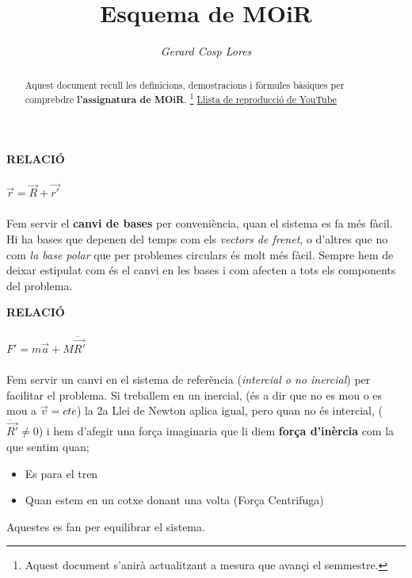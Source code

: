 \documentclass[11pt]{article}
\title{\textbf{Esquema de MOiR}}
\author{\textit{Gerard Cosp Lores}}
\date{}
\begin{document}
\maketitle

\maketitle

\begin{abstract}
Aquest document recull les definicions, demostracions i fòrmules bàsiques per comprebdre \textbf{l'assignatura de MOiR}. \footnote{Aquest document s'anirà actualitzant a mesura que avançi el semmestre.}  \href{https://www.youtube.com/playlist?list=PLHUo38kJ-fy_nZMtgL7zuIbyaXeBjjC-e}{Llista de reproducció de YouTube}
\end{abstract}

\begin{tcolorbox}[
  title= Canvis de Base,
  colback=RoyalBlue!5!white,
  colframe=RoyalBlue!70!black,
  coltitle=white,
  colbacktitle=RoyalBlue!70!black,
  fonttitle=\bfseries,
  arc=6pt,
  boxrule=0.8pt
]

\textbf{RELACIÓ}\\
\\
$\vec{r} = \vec{R} + \vec{r'}$\\
\\
Fem servir el \textbf{canvi de bases} per conveniència, quan el sistema es fa més fàcil. Hi ha bases que depenen del temps com els \textit{vectors de frenet}, o d'altres que no com \textit{la base polar} que per problemes circulars és molt més fàcil. Sempre hem de deixar estipulat com és el canvi en les bases i com afecten a tots els components del problema.
\end{tcolorbox}

\begin{tcolorbox}[
  title=Sistemes de Referència,
  colback=SlateGray!5!white,
  colframe=SlateGray!70!black,
  coltitle=white,
  colbacktitle=SlateGray!70!black,
  fonttitle=\bfseries,
  arc=6pt,
  boxrule=0.8pt
]

\textbf{RELACIÓ}\\
\\
$F' = m\vec{a} + M\ddot{\vec{R'}}$\\
\\
Fem servir un canvi en el sistema de referència (\textit{intercial o no inercial}) per facilitar el problema. Si treballem en un inercial, (és a dir que no es mou o es mou a $\vec{v} = cte$) la 2a Llei de Newton aplica igual, pero quan no és intercial, ($\ddot{\vec{R'}} \neq 0$) i hem d'afegir una força imaginaria que li diem \textbf{força d'inèrcia} com la que sentim quan;

\begin{itemize}
  \item Es para el tren
  \item Quan estem en un cotxe donant una volta (Força Centrifuga)
\end{itemize}

Aquestes es fan per equilibrar el sistema.
\end{tcolorbox}
\end{document}
